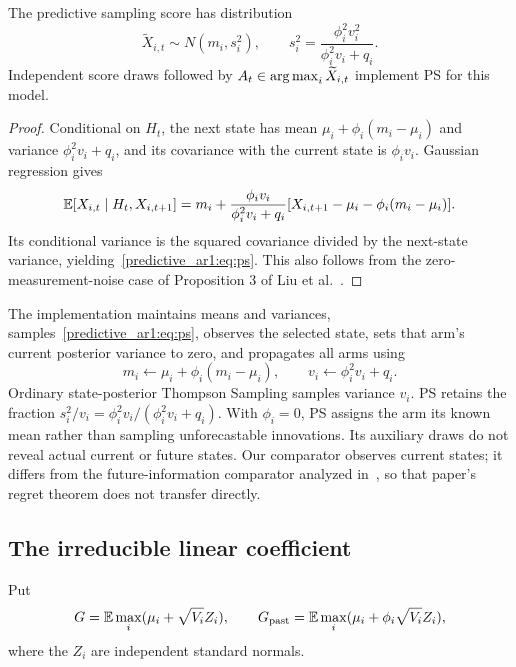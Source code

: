 \begin{proposition}
The predictive sampling score has distribution
\begin{equation}
\widetilde X_{i,t}\sim N(m_i,s_i^2),\qquad
s_i^2=\frac{\phi_i^2v_i^2}{\phi_i^2v_i+q_i}.
\label{predictive_ar1:eq:ps}
\end{equation}
Independent score draws followed by $A_t\in\operatorname*{arg\,max}_i\widetilde X_{i,t}$ implement PS for this model.
\end{proposition}
\begin{proof}
Conditional on $H_t$, the next state has mean $\mu_i+\phi_i(m_i-\mu_i)$ and variance $\phi_i^2v_i+q_i$, and its covariance with the current state is $\phi_iv_i$. Gaussian regression gives
\[
\mathbb E[X_{i,t}\mid H_t,X_{i,t+1}]
=m_i+\frac{\phi_iv_i}{\phi_i^2v_i+q_i}
[X_{i,t+1}-\mu_i-\phi_i(m_i-\mu_i)].
\]
Its conditional variance is the squared covariance divided by the next-state variance, yielding~\eqref{predictive_ar1:eq:ps}. This also follows from the zero-measurement-noise case of Proposition 3 of Liu et al.~\cite{collected10}.
\end{proof}

The implementation maintains means and variances, samples~\eqref{predictive_ar1:eq:ps}, observes the selected state, sets that arm's current posterior variance to zero, and propagates all arms using
\[
m_i\leftarrow\mu_i+\phi_i(m_i-\mu_i),\qquad
v_i\leftarrow\phi_i^2v_i+q_i.
\]
Ordinary state-posterior Thompson Sampling samples variance $v_i$. PS retains the fraction $s_i^2/v_i=\phi_i^2v_i/(\phi_i^2v_i+q_i)$. With $\phi_i=0$, PS assigns the arm its known mean rather than sampling unforecastable innovations. Its auxiliary draws do not reveal actual current or future states. Our comparator observes current states; it differs from the future-information comparator analyzed in~\cite{collected10}, so that paper's regret theorem does not transfer directly.

\subsection{The irreducible linear coefficient}
Put
\begin{equation}
G=\mathbb E\max_i(\mu_i+\sqrt{V_i}Z_i),\qquad
G_{\mathrm{past}}=\mathbb E\max_i(\mu_i+\phi_i\sqrt{V_i}Z_i),
\end{equation}
where the $Z_i$ are independent standard normals.

